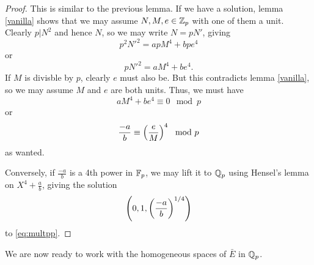 \documentclass[12pt, a4paper]{amsart}
\begin{document}
\begin{proof}
  This is similar to the previous lemma. If we have a solution,
  lemma \autoref{vanilla} shows that we may assume $N, M, e \in {\mathbb Z}_p$ with one
  of them a unit. Clearly $p | N^2$ and hence $N$, so we may write $N = pN'$,
  giving
  \[p^2N'^2 = apM^4 + bpe^4\]
  or
  \[pN'^2 = aM^4 + be^4.\]
  If $M$ is divisble by $p$, clearly $e$ must also be. But this contradicts lemma
  \autoref{vanilla}, so we may assume $M$ and $e$ are both units.
  Thus, we must have
  \[aM^4 + be^4 \equiv 0 \mod{p}\]
  or
  \[\frac{-a}{b} \equiv \left(\frac{e}{M}\right)^4 \mod{p}\]
  as wanted.

  Conversely, if $\frac{-a}{b}$ is a 4th power in $\mathbb{F}_p$, we may lift it to
  ${\mathbb Q}_p$ using
  Hensel's lemma on $X^4 + \frac{a}{b}$, giving the solution
  \[\left(0, 1, \left(\frac{-a}{b}\right)^{1/4}\right)\]
  to \autoref{eq:multpp}.
\end{proof}

We are now ready to work with the homogeneous spaces of $\bar{E}$ in ${\mathbb Q}_p$.
\end{document}
